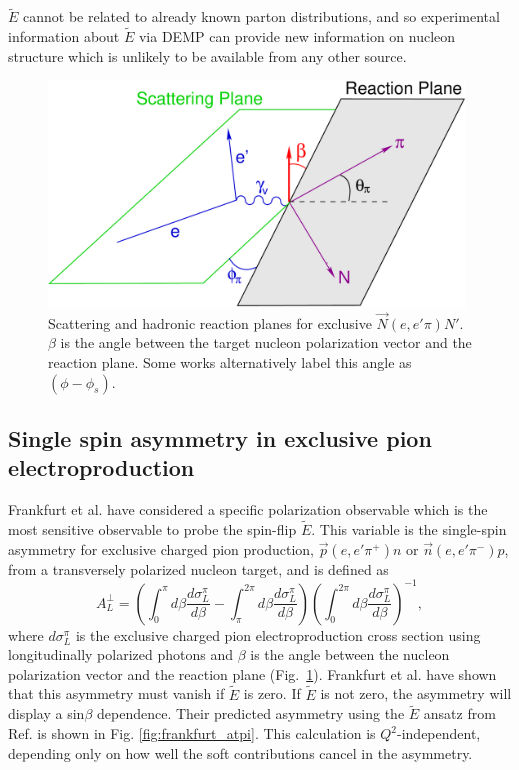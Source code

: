 $\tilde{E}$ cannot be related to already known parton distributions,
and so experimental information about $\tilde{E}$ via DEMP 
can provide new information on nucleon structure which is
unlikely to be available from any other source.

\begin{figure}[hbt!]
\begin{center}
\includegraphics[height=6cm]{./figures/atpi_planes.pdf}
\end{center}
\caption{\label{fig:planes}
Scattering and hadronic reaction planes for exclusive $\vec{N}(e,e'\pi)N'$.
$\beta$ is the angle between the target nucleon polarization vector and the
reaction plane.  Some works alternatively label this angle as $(\phi-\phi_s)$.
}
\end{figure}

\subsection{Single spin asymmetry in exclusive pion electroproduction}

Frankfurt et al. \cite{Fr99} have considered a specific polarization observable
which is the most sensitive observable to probe the spin-flip $\tilde{E}$.
This variable is the single-spin asymmetry for exclusive charged pion
production, $\vec{p}(e,e'\pi^+)n$ or $\vec{n}(e,e'\pi^-)p$, from a transversely
polarized nucleon target, and is defined \cite{Be01} as
\begin{equation} \label{eqn:asy}
A_L^{\perp}=(\int^{\pi}_0 d\beta \frac{d\sigma^{\pi}_L}{d\beta} -
\int^{2\pi}_{\pi} d\beta \frac{d\sigma^{\pi}_L}{d\beta})
(\int^{2\pi}_0 d\beta \frac{d\sigma^{\pi}_L}{d\beta})^{-1},
\end{equation}
where $d\sigma^{\pi}_L$ is the exclusive charged pion electroproduction cross
section using longitudinally polarized photons and $\beta$ is the angle between
the nucleon polarization vector and the reaction plane (Fig.~\ref{fig:planes}).  
Frankfurt et al. \cite{Fr99} have shown that this asymmetry must vanish if
$\tilde{E}$ is zero.  If $\tilde{E}$ is not zero, the asymmetry will display a
sin$\beta$ dependence.  Their predicted asymmetry using the $\tilde{E}$ ansatz
from Ref. \cite{Va99} is shown in Fig. \ref{fig:frankfurt_atpi}.  This
calculation is $Q^2$-independent, depending only on how well the soft
contributions cancel in the asymmetry.

